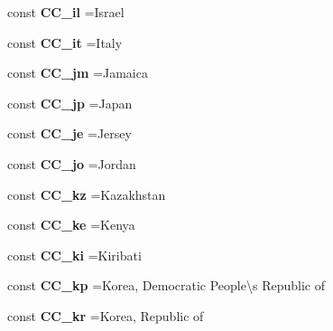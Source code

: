 \begin{DoxyCompactItemize}
const {\bfseries C\+C\+\_\+il} =\textquotesingle{}Israel\textquotesingle{}
\item 
\hypertarget{class_i_s_o_ad51d9e7be8e2979dde31ed9c45c965eb}{}\label{class_i_s_o_ad51d9e7be8e2979dde31ed9c45c965eb} 
const {\bfseries C\+C\+\_\+it} =\textquotesingle{}Italy\textquotesingle{}
\item 
\hypertarget{class_i_s_o_a20555378819954403e91151dd683781c}{}\label{class_i_s_o_a20555378819954403e91151dd683781c} 
const {\bfseries C\+C\+\_\+jm} =\textquotesingle{}Jamaica\textquotesingle{}
\item 
\hypertarget{class_i_s_o_aa4ad99f395e8fe489851cb2d48e337d1}{}\label{class_i_s_o_aa4ad99f395e8fe489851cb2d48e337d1} 
const {\bfseries C\+C\+\_\+jp} =\textquotesingle{}Japan\textquotesingle{}
\item 
\hypertarget{class_i_s_o_a821997b9684a7734de00e2ace9c7c0bc}{}\label{class_i_s_o_a821997b9684a7734de00e2ace9c7c0bc} 
const {\bfseries C\+C\+\_\+je} =\textquotesingle{}Jersey\textquotesingle{}
\item 
\hypertarget{class_i_s_o_a68b442cb2e0e7b8fdb274ea1484bd93d}{}\label{class_i_s_o_a68b442cb2e0e7b8fdb274ea1484bd93d} 
const {\bfseries C\+C\+\_\+jo} =\textquotesingle{}Jordan\textquotesingle{}
\item 
\hypertarget{class_i_s_o_a6ca950bcc27c239d2eadbd3f612aab33}{}\label{class_i_s_o_a6ca950bcc27c239d2eadbd3f612aab33} 
const {\bfseries C\+C\+\_\+kz} =\textquotesingle{}Kazakhstan\textquotesingle{}
\item 
\hypertarget{class_i_s_o_acbdfc48061894de4516af9ad7fbf2a9f}{}\label{class_i_s_o_acbdfc48061894de4516af9ad7fbf2a9f} 
const {\bfseries C\+C\+\_\+ke} =\textquotesingle{}Kenya\textquotesingle{}
\item 
\hypertarget{class_i_s_o_a1c0d7e6dcaf88cbbf777e4c3b035996d}{}\label{class_i_s_o_a1c0d7e6dcaf88cbbf777e4c3b035996d} 
const {\bfseries C\+C\+\_\+ki} =\textquotesingle{}Kiribati\textquotesingle{}
\item 
\hypertarget{class_i_s_o_aa056c94e84a23d8a8da2d18fbc35bd1d}{}\label{class_i_s_o_aa056c94e84a23d8a8da2d18fbc35bd1d} 
const {\bfseries C\+C\+\_\+kp} =\textquotesingle{}Korea, Democratic People\textbackslash{}\textquotesingle{}s Republic of\textquotesingle{}
\item 
\hypertarget{class_i_s_o_a3761fede498a316f1ad15ba6a15b79ae}{}\label{class_i_s_o_a3761fede498a316f1ad15ba6a15b79ae} 
const {\bfseries C\+C\+\_\+kr} =\textquotesingle{}Korea, Republic of\textquotesingle{}
\item 
\hypertarget{class_i_s_o_a61cd37ade1c24d0bdbbce85154c51b4c}{}\label{class_i_s_o_a61cd37ade1c24d0bdbbce85154c51b4c} 

\end{DoxyCompactItemize}
